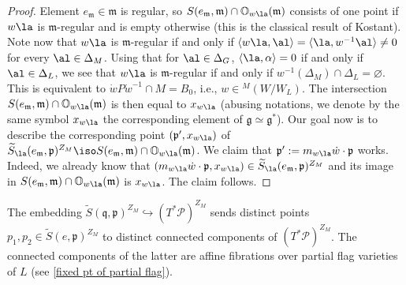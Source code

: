 \documentclass[12pt]{amsart}
\begin{document}
\begin{proof}
Element $e_{\mathfrak{m}} \in \mathfrak{m}$ is regular, so $S(e_{\mathfrak{m}},\mathfrak{m}) \cap \mathbb{O}_{w\la}(\mathfrak{m})$ consists of one point if $w\la$ is $\mathfrak{m}$-regular and is empty otherwise (this is the classical result of Kostant).
Note now that $w\la$ is $\mathfrak{m}$-regular if and only if $\langle w\la, \al\rangle = \langle \la, w^{-1}\al\rangle \neq 0$ for every $\al \in \Delta_{M}$. Using that for $\al \in \Delta_G$, $\langle \la, \alpha \rangle = 0$ if and only if $\al \in \Delta_{L}$, we see that $w\la$ is $\mathfrak{m}$-regular if and only if $w^{-1}(\Delta_M) \cap \Delta_L = \varnothing$. This is equivalent to $\dot{w}P\dot{w}^{-1} \cap M = B_0$, i.e., $w \in  {}^M(W/W_{L})$. The intersection $S(e_{\mathfrak{m}},\mathfrak{m}) \cap \mathbb{O}_{w\la}(\mathfrak{m})$ is then equal to $x_{w\la}$ (abusing notations, we denote by the same symbol $x_{w\la}$ the corresponding element of $\mathfrak{g} \simeq \mathfrak{g}^*$). 
Our goal now is to describe the corresponding point $(\mathfrak{p}',x_{w\la})$ of $\widetilde{S}_\la(e_{\mathfrak{m}},\mathfrak{p})^{Z_M} \iso S(e_{\mathfrak{m}},\mathfrak{m}) \cap {\mathbb{O}}_{w\la}(\mathfrak{m})$.
We claim that $\mathfrak{p}':=m_{w\la} \dot{w} \cdot \mathfrak{p}$ works. 
Indeed, we already know that $(m_{w\la} \dot{w} \cdot \mathfrak{p},x_{w\la}) \in \widetilde{S}_\la(e_{\mathfrak{m}},\mathfrak{p})^{Z_M}$ and its image in $S(e_{\mathfrak{m}},\mathfrak{m}) \cap {\mathbb{O}}_{w\la}(\mathfrak{m})$ is $x_{w\la}$. The claim follows.
\end{proof}


\begin{cor}\label{dist_comp_fixed}
The embedding $\widetilde{S}(\mathfrak{q},\mathfrak{p})^{Z_M} \hookrightarrow (T^*\mathcal{P})^{Z_M}$ sends distinct points $p_1,p_2 \in \widetilde{S}(e,\mathfrak{p})^{Z_M}$ to distinct connected components of $(T^*\mathcal{P})^{Z_M}$. The connected components of the latter are affine fibrations over partial flag varieties of $L$ (see \cref{fixed pt of partial flag}).
\end{cor}
\end{document}
